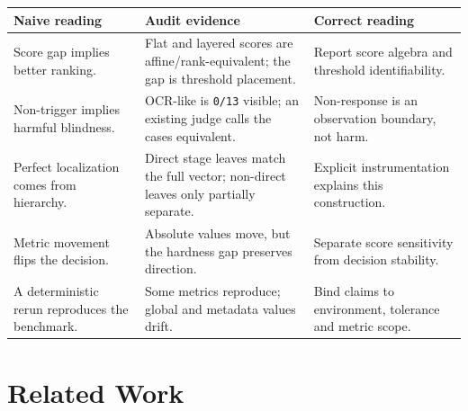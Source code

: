 \documentclass[10pt]{article}
\begin{document}
\begin{table}[t]
\centering
\small
\setlength{\tabcolsep}{3pt}
\begin{tabular}{>{\raggedright\arraybackslash}p{}>{\raggedright\arraybackslash}p{}>{\raggedright\arraybackslash}p{}}
\hline
Naive reading & Audit evidence & Correct reading \\
\hline
Score gap implies better ranking. & Flat and layered scores are affine/rank-equivalent; the gap is threshold placement. & Report score algebra and threshold identifiability. \\
Non-trigger implies harmful blindness. & OCR-like is \texttt{0/13} visible; an existing judge calls the cases equivalent. & Non-response is an observation boundary, not harm. \\
Perfect localization comes from hierarchy. & Direct stage leaves match the full vector; non-direct leaves only partially separate. & Explicit instrumentation explains this construction. \\
Metric movement flips the decision. & Absolute values move, but the hardness gap preserves direction. & Separate score sensitivity from decision stability. \\
A deterministic rerun reproduces the benchmark. & Some metrics reproduce; global and metadata values drift. & Bind claims to environment, tolerance and metric scope. \\
\hline
\end{tabular}
\end{table}
\section{Related Work}
\end{document}
